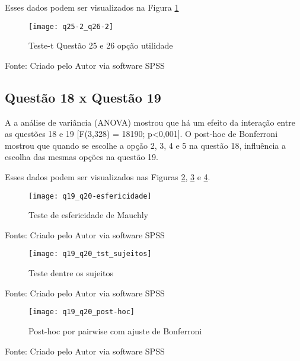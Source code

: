 Esses dados podem ser visualizados na Figura \ref{fig:figura-q25-2_q26-2}
\begin{figure}[H]
	\centering	
	\caption{Teste-t Questão 25 e 26 opção utilidade}
	\texttt{[image: q25-2\_q26-2]}
	\label{fig:figura-q25-2_q26-2}
\end{figure}
\vspace{-0.8 cm} \hspace{1.55 cm} Fonte: Criado pelo Autor via software SPSS\newline

\subsection{Questão 18 x Questão 19}

A a análise de variância (ANOVA) mostrou que há um efeito da interação entre as questões 18 e 19 [F(3,328) = 18190; p<0,001]. O post-hoc de Bonferroni mostrou que quando se escolhe a opção 2, 3, 4 e 5 na questão 18, influência a escolha das mesmas opções na questão 19.

Esses dados podem ser visualizados nas Figuras \ref{fig:figura-q19_q20-esfericidade}, \ref{fig:figura-q19_q20_tst_sujeitos} e \ref{fig:figura-q19_q20_post-hoc}.
\begin{figure}[H]
	\centering	
	\caption{Teste de esfericidade de Mauchly}
	\texttt{[image: q19\_q20-esfericidade]}
	\label{fig:figura-q19_q20-esfericidade}
\end{figure}
\vspace{-0.8 cm} \hspace{1.55 cm} Fonte: Criado pelo Autor via software SPSS

\begin{figure}[H]
	\centering	
	\caption{Teste dentre os sujeitos}
	\texttt{[image: q19\_q20\_tst\_sujeitos]}
	\label{fig:figura-q19_q20_tst_sujeitos}
\end{figure}
\vspace{-0.8 cm} \hspace{1.55 cm} Fonte: Criado pelo Autor via software SPSS

\begin{figure}[H]
	\centering	
	\caption{Post-hoc por pairwise com ajuste de Bonferroni}
	\texttt{[image: q19\_q20\_post-hoc]}
	\label{fig:figura-q19_q20_post-hoc}
\end{figure}
\vspace{-0.8 cm} \hspace{1.55 cm} Fonte: Criado pelo Autor via software SPSS


